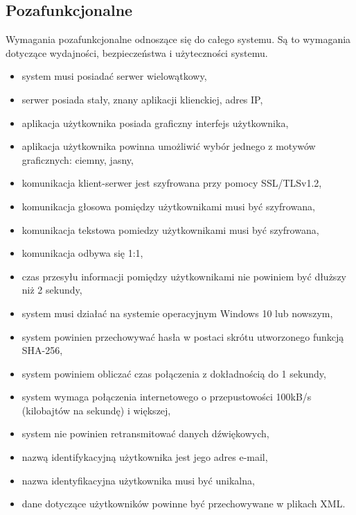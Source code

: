 \documentclass[12pt,a4paper]{article}
\begin{document}
	\subsection{Pozafunkcjonalne}
	Wymagania pozafunkcjonalne odnoszące się do całego systemu. Są to wymagania dotyczące wydajności, bezpieczeństwa i użyteczności systemu.
	\begin{itemize}
		\item system musi posiadać serwer wielowątkowy,
		\item serwer posiada stały, znany aplikacji klienckiej, adres IP,
		\item aplikacja użytkownika posiada graficzny interfejs użytkownika,
		\item aplikacja użytkownika powinna umożliwić wybór jednego z motywów graficznych: ciemny, jasny,
		\item komunikacja klient-serwer jest szyfrowana przy pomocy SSL/TLSv1.2,
		\item komunikacja głosowa pomiędzy użytkownikami musi być szyfrowana,
		\item komunikacja tekstowa pomiedzy użytkownikami musi być szyfrowana,
		\item komunikacja odbywa się 1:1,
		\item czas przesyłu informacji pomiędzy użytkownikami nie powiniem być dłuższy niż 2 sekundy,
		\item system musi działać na systemie operacyjnym Windows 10 lub nowszym,
		\item system powinien przechowywać hasła w postaci skrótu utworzonego funkcją SHA-256,
		\item system powiniem obliczać czas połączenia z dokładnością do 1 sekundy,
		\item system wymaga połączenia internetowego o przepustowości 100kB/s (kilobajtów na sekundę) i większej,
		\item system nie powinien retransmitować danych dźwiękowych,
		\item nazwą identifykacyjną użytkownika jest jego adres e-mail,
		\item nazwa identyfikacyjna użytkownika musi być unikalna, 
		\item dane dotyczące użytkowników powinne być przechowywane w plikach XML.
	\end{itemize}
	
\end{document}

